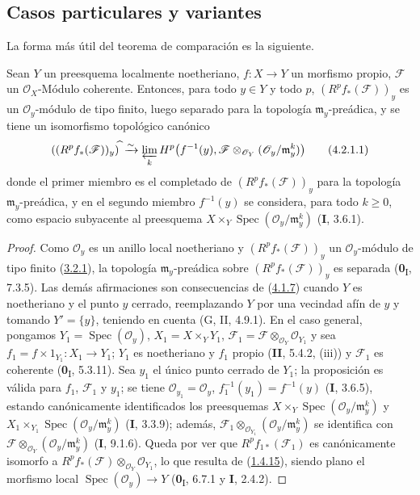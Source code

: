 \subsection{Casos particulares y variantes}
\label{subsection:III.4.2}
\label{subsection:III.4.2-fr}

La forma más útil del teorema de comparación  es la
siguiente.

\begin{proposition}[4.2.1]
\label{III.4.2.1-fr}
Sean $Y$ un preesquema localmente noetheriano, $f:X\to Y$ un morfismo
propio, $\mathcal F$ un $\mathcal O_X$-Módulo coherente. Entonces, para todo
$y\in Y$ y todo $p$, $(R^pf_*(\mathcal F))_y$ es
un $\mathcal O_y$-módulo de tipo finito, luego separado para la topología
$\mathfrak m_y$-preádica, y se tiene un isomorfismo topológico canónico
\[
((R^pf_*(\mathcal F))_y)^{\widehat{\,}}
\xrightarrow{\sim}
\varprojlim_kH^p\bigl(f^{-1}(y),
\mathcal F\otimes_{\mathcal O_Y}(\mathcal O_y/\mathfrak m_y^k)\bigr)
\tag{4.2.1.1}\label{III.4.2.1.1-fr}
\]
donde el primer miembro es el completado de $(R^pf_*(\mathcal F))_y$ para la
topología $\mathfrak m_y$-preádica, y en el segundo miembro $f^{-1}(y)$ se
considera, para todo $k\geq0$, como espacio subyacente al preesquema
$X\times_Y\operatorname{Spec}(\mathcal O_y/\mathfrak m_y^k)$
\textup{(\textbf{I}, 3.6.1)}.
\end{proposition}

\begin{proof}
Como $\mathcal O_y$ es un anillo local noetheriano y
$(R^pf_*(\mathcal F))_y$ un $\mathcal O_y$-módulo de tipo finito
(\hyperref[III.3.2.1-fr]{3.2.1}), la topología $\mathfrak m_y$-preádica
sobre $(R^pf_*(\mathcal F))_y$ es separada (\textbf{0}\textsubscript{I}, 7.3.5). Las
demás afirmaciones son consecuencias de (\hyperref[III.4.1.7-fr]{4.1.7})
cuando $Y$ es noetheriano y el punto $y$ cerrado, reemplazando $Y$ por una
vecindad afín de $y$ y tomando $Y'=\{y\}$, teniendo en cuenta
(G, II, 4.9.1). En el caso general, pongamos
$Y_1=\operatorname{Spec}(\mathcal O_y)$, $X_1=X\times_YY_1$,
$\mathcal F_1=\mathcal F\otimes_{\mathcal O_Y}\mathcal O_{Y_1}$
y sea $f_1=f\times1_{Y_1}:X_1\to Y_1$; $Y_1$ es noetheriano y $f_1$
propio (\textbf{II}, 5.4.2, (iii)) y $\mathcal F_1$ es coherente
(\textbf{0}\textsubscript{I}, 5.3.11). Sea $y_1$ el único punto cerrado de $Y_1$;
la proposición es válida para $f_1$, $\mathcal F_1$ y $y_1$; se tiene
$\mathcal O_{y_1}=\mathcal O_y$, $f_1^{-1}(y_1)=f^{-1}(y)$ (\textbf{I}, 3.6.5),
estando canónicamente identificados los preesquemas
$X\times_Y\operatorname{Spec}(\mathcal O_y/\mathfrak m_y^k)$ y
$X_1\times_{Y_1}\operatorname{Spec}(\mathcal O_y/\mathfrak m_y^k)$
(\textbf{I}, 3.3.9); además,
$\mathcal F_1\otimes_{\mathcal O_{Y_1}}
(\mathcal O_y/\mathfrak m_y^k)$ se identifica con
$\mathcal F\otimes_{\mathcal O_Y}(\mathcal O_y/\mathfrak m_y^k)$
(\textbf{I}, 9.1.6). Queda por ver que $R^pf_{1*}(\mathcal F_1)$ es
canónicamente isomorfo a
$R^pf_*(\mathcal F)\otimes_{\mathcal O_Y}\mathcal O_{Y_1}$, lo que
resulta de (\hyperref[III.1.4.15-fr]{1.4.15}), siendo plano el morfismo local
$\operatorname{Spec}(\mathcal O_y)\to Y$
(\textbf{0}\textsubscript{I}, 6.7.1 y \textbf{I}, 2.4.2).
\end{proof}

